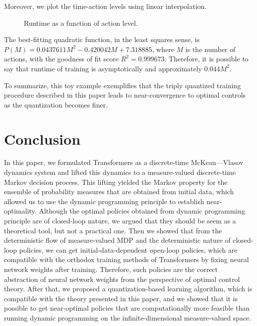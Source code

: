 \documentclass[11pt]{article}
\begin{document}
Moreover, we plot the time-action levels using linear interpolation.


\begin{figure}[H]
\centering
{}
\caption{Runtime as a function of action level.}
\end{figure}

The best-fitting quadratic function, in the least squares sense, is $P(M) = 0.0437611M^2-0.420042M+7.318885$, where $M$ is the number of actions, with the goodness of fit score $R^2=0.999673$. Therefore, it is possible to say that runtime of training is asymptotically and approximately $0.044M^2$.

To summarize, this toy example exemplifies that the triply quantized training procedure described in this paper leads to near-convergence to optimal controls as the quantization becomes finer.

\section{Conclusion}
In this paper, we formulated Transformers as a discrete-time McKean---Vlasov dynamics system and lifted this dynamics to a measure-valued discrete-time Markov decision process. This lifting yielded the Markov property for the ensemble of probability measures that are obtained from initial data, which allowed us to use the dynamic programming principle to establish near-optimality. Although the optimal policies obtained from dynamic programming principle are of closed-loop nature, we argued that they should be seem as a theoretical tool, but not a practical one. Then we showed that from the deterministic flow of measure-valued MDP and the deterministic nature of closed-loop policies, we can get initial-data-dependent open-loop policies, which are compatible with the orthodox training methods of Transformers by fixing neural network weights after training. Therefore, such policies are the correct abstraction of neural network weights from the perspective of optimal control theory. After that, we proposed a quantization-based learning algorithm, which is compatible with the theory presented in this paper, and we showed that it is possible to get near-optimal policies that are computationally more feasible than running dynamic programming on the infinite-dimensional measure-valued space.
\end{document}
